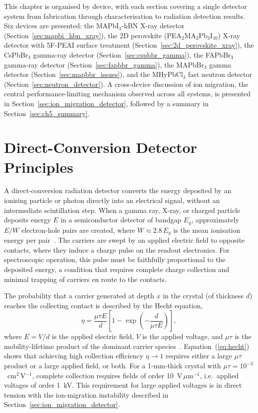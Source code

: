 This chapter is organised by device, with each section covering a
single detector system from fabrication through characterisation to
radiation detection results.  Six devices are presented: the
MAPbI$_3$-hBN X-ray detector
(Section~\ref{sec:mapbi_hbn_xray}), the 2D perovskite
(PEA$_2$MA$_2$Pb$_3$I$_{10}$) X-ray detector with 5F-PEAI surface
treatment (Section~\ref{sec:2d_perovskite_xray}), the
CsPbBr$_3$ gamma-ray detector
(Section~\ref{sec:cspbbr_gamma}), the FAPbBr$_3$ gamma-ray
detector (Section~\ref{sec:fapbbr_gamma}), the MAPbBr$_3$ gamma
detector (Section~\ref{sec:mapbbr_issues}), and the MHyPbCl$_3$
fast neutron detector
(Section~\ref{sec:neutron_detector}).  A cross-device discussion
of ion migration, the central performance-limiting mechanism
observed across all systems, is presented in
Section~\ref{sec:ion_migration_detector}, followed by a summary
in Section~\ref{sec:ch5_summary}.


\section{Direct-Conversion Detector Principles}
\label{sec:detector_principles}

A direct-conversion radiation detector converts the energy
deposited by an ionising particle or photon directly into an
electrical signal, without an intermediate scintillation step.
When a gamma ray, X-ray, or charged particle deposits energy $E$
in a semiconductor detector of bandgap $E_g$, approximately
$E/W$ electron-hole pairs are created, where
$W \approx 2.8\,E_g$ is the mean ionisation energy per
pair~\cite{knoll2010}.  The carriers are swept by an applied
electric field to opposite contacts, where they induce a charge
pulse on the readout electronics.  For spectroscopic operation,
this pulse must be faithfully proportional to the deposited
energy, a condition that requires complete charge collection
and minimal trapping of carriers en route to the contacts.

The probability that a carrier generated at depth $x$ in the
crystal (of thickness $d$) reaches the collecting contact is
described by the Hecht equation,
\begin{equation}
  \eta = \frac{\mu\tau E}{d}
    \left[1 - \exp\!\left(-\frac{d}{\mu\tau E}\right)\right],
  \label{eq:hecht}
\end{equation}
where $E = V/d$ is the applied electric field, $V$ is the applied
voltage, and $\mu\tau$ is the mobility-lifetime product of the
dominant carrier species~\cite{Hofstadter1949}.
Equation~(\ref{eq:hecht}) shows that achieving high collection
efficiency $\eta \to 1$ requires either a large $\mu\tau$ product
or a large applied field, or both.  For a 1-mm-thick crystal with
$\mu\tau = 10^{-3}$~cm$^2$\,V$^{-1}$, complete collection
requires fields of order 10~V\,$\mu$m$^{-1}$, i.e.\ applied
voltages of order 1~kV.  This requirement for large applied
voltages is in direct tension with the ion-migration instability
described in Section~\ref{sec:ion_migration_detector}.

